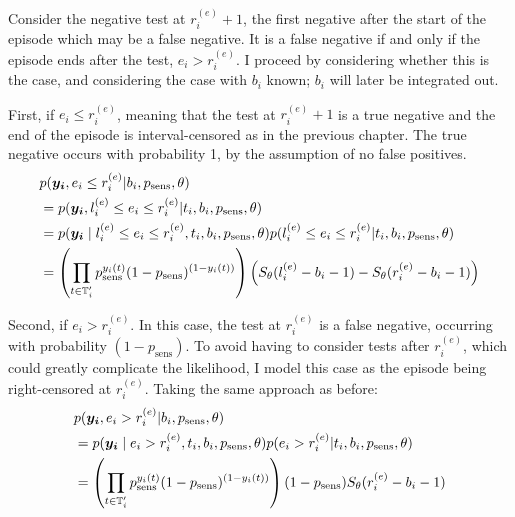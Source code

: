 \documentclass[thesis.tex]{subfiles}
\begin{document}
Consider the negative test at $r_i^{(e)}+1$, the first negative after the start of the episode which may be a false negative.
It is a false negative if and only if the episode ends after the test, \ie $e_i > r_i^{(e)}$.
I proceed by considering whether this is the case, and considering the case with $b_i$ known; $b_i$ will later be integrated out.

First, if $e_i \leq r_i^{(e)}$, meaning that the test at $r_i^{(e)}+1$ is a true negative and the end of the episode is interval-censored as in the previous chapter.
The true negative occurs with probability 1, by the assumption of no false positives.
\begin{align}
&p(\vec{y_i}, e_i \leq r_i^{(e)} | b_i, p_\text{sens}, \theta) \\
&= p(\vec{y_i}, l_i^{(e)} \leq e_i \leq r_i^{(e)} | t_i, b_i, p_\text{sens}, \theta) \\ %
&= p(\vec{y_i} \mid l_i^{(e)} \leq e_i \leq r_i^{(e)}, t_i, b_i, p_\text{sens}, \theta) p(l_i^{(e)} \leq e_i \leq r_i^{(e)} | t_i, b_i, p_\text{sens}, \theta) \\
&= \left( \prod_{t \in \sched'_i} p_\text{sens}^{y_i(t)} (1 - p_\text{sens})^{(1 - y_i(t))} \right) \left( S_\theta(l_i^{(e)} - b_i - 1) - S_\theta(r_i^{(e)} - b_i - 1) \right)
\label{imperf-test:eq:ll-ei-lt-ri}
\end{align}

Second, if $e_i > r_i^{(e)}$.
In this case, the test at $r_i^{(e)}$ is a false negative, occurring with probability $(1 - p_\text{sens})$.
To avoid having to consider tests after $r_i^{(e)}$, which could greatly complicate the likelihood, I model this case as the episode being right-censored at $r_i^{(e)}$.
Taking the same approach as before:
\begin{align}
&p(\bm{y_i}, e_i > r_i^{(e)} | b_i, p_\text{sens}, \theta) \\
&= p(\bm{y_i} \mid e_i > r_i^{(e)}, t_i, b_i, p_\text{sens}, \theta) p(e_i > r_i^{(e)} | t_i, b_i, p_\text{sens}, \theta) \\
&= \left( \prod_{t \in \mathbb{T}'_i} p_\text{sens}^{y_i(t)} (1 - p_\text{sens})^{(1 - y_i(t))} \right) (1 - p_\text{sens}) S_\theta(r_i^{(e)} - b_i - 1)
\label{imperf-test:eq:ll-ei-gt-ri}
\end{align}
\end{document}
